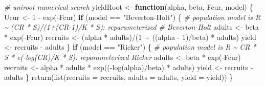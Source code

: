 \documentclass[
]{article}
\newenvironment{Shaded}{\begin{snugshade}}{\end{snugshade}}
\newcommand{\AttributeTok}[1]{\textcolor[rgb]{0.77,0.63,0.00}{#1}}
\newcommand{\CommentTok}[1]{\textcolor[rgb]{0.56,0.35,0.01}{\textit{#1}}}
\newcommand{\ControlFlowTok}[1]{\textcolor[rgb]{0.13,0.29,0.53}{\textbf{#1}}}
\newcommand{\DecValTok}[1]{\textcolor[rgb]{0.00,0.00,0.81}{#1}}
\newcommand{\FunctionTok}[1]{\textcolor[rgb]{0.00,0.00,0.00}{#1}}
\newcommand{\NormalTok}[1]{#1}
\newcommand{\OtherTok}[1]{\textcolor[rgb]{0.56,0.35,0.01}{#1}}
\newcommand{\SpecialCharTok}[1]{\textcolor[rgb]{0.00,0.00,0.00}{#1}}
\newcommand{\StringTok}[1]{\textcolor[rgb]{0.31,0.60,0.02}{#1}}
\begin{document}
\begin{Shaded}
\begin{Highlighting}[]
\CommentTok{\# uniroot numerical search}
\NormalTok{yieldRoot }\OtherTok{\textless{}{-}} \ControlFlowTok{function}\NormalTok{(alpha, beta, Fcur, model) \{}
\NormalTok{    Ucur }\OtherTok{\textless{}{-}} \DecValTok{1} \SpecialCharTok{{-}} \FunctionTok{exp}\NormalTok{(}\SpecialCharTok{{-}}\NormalTok{Fcur)}
    \ControlFlowTok{if}\NormalTok{ (model }\SpecialCharTok{==} \StringTok{"Beverton{-}Holt"}\NormalTok{) \{}
        \CommentTok{\# population model is R \textasciitilde{} (CR * S)/(1+(CR{-}1)/K * S): reparameterized}
        \CommentTok{\# Beverton{-}Holt}
\NormalTok{        adults }\OtherTok{\textless{}{-}}\NormalTok{ beta }\SpecialCharTok{*} \FunctionTok{exp}\NormalTok{(}\SpecialCharTok{{-}}\NormalTok{Fcur)}
\NormalTok{        recruits }\OtherTok{\textless{}{-}}\NormalTok{ (alpha }\SpecialCharTok{*}\NormalTok{ adults)}\SpecialCharTok{/}\NormalTok{(}\DecValTok{1} \SpecialCharTok{+}\NormalTok{ ((alpha }\SpecialCharTok{{-}} \DecValTok{1}\NormalTok{)}\SpecialCharTok{/}\NormalTok{beta) }\SpecialCharTok{*}\NormalTok{ adults)}
\NormalTok{        yield }\OtherTok{\textless{}{-}}\NormalTok{ recruits }\SpecialCharTok{{-}}\NormalTok{ adults}
\NormalTok{    \}}
    \ControlFlowTok{if}\NormalTok{ (model }\SpecialCharTok{==} \StringTok{"Ricker"}\NormalTok{) \{}
        \CommentTok{\# population model is R \textasciitilde{} CR * S * e({-}log(CR)/K * S): reparameterized Ricker}
\NormalTok{        adults }\OtherTok{\textless{}{-}}\NormalTok{ beta }\SpecialCharTok{*} \FunctionTok{exp}\NormalTok{(}\SpecialCharTok{{-}}\NormalTok{Fcur)}
\NormalTok{        recruits }\OtherTok{\textless{}{-}}\NormalTok{ alpha }\SpecialCharTok{*}\NormalTok{ adults }\SpecialCharTok{*} \FunctionTok{exp}\NormalTok{((}\SpecialCharTok{{-}}\FunctionTok{log}\NormalTok{(alpha)}\SpecialCharTok{/}\NormalTok{beta) }\SpecialCharTok{*}\NormalTok{ adults)}
\NormalTok{        yield }\OtherTok{\textless{}{-}}\NormalTok{ recruits }\SpecialCharTok{{-}}\NormalTok{ adults}
\NormalTok{    \}}
    \FunctionTok{return}\NormalTok{(}\FunctionTok{list}\NormalTok{(}\AttributeTok{recruits =}\NormalTok{ recruits, }\AttributeTok{adults =}\NormalTok{ adults, }\AttributeTok{yield =}\NormalTok{ yield))}
\NormalTok{\}}


\end{Highlighting}
\end{Shaded}
\end{document}
